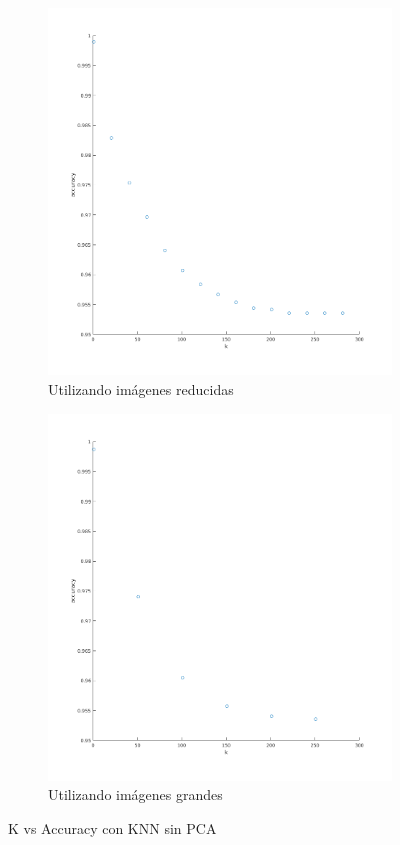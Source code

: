\begin{figure}[H]
\begin{subfigure}[h]{0.62\linewidth}
\includegraphics[width=\linewidth]{img/k_knn_accu.png}
\caption{Utilizando imágenes reducidas}
\end{subfigure}
\hfill
\begin{subfigure}[h]{0.62\linewidth}
\includegraphics[width=\linewidth]{img/big_k_knn_accu.png}
\caption{Utilizando imágenes grandes}
\end{subfigure}%
\caption{K vs Accuracy con KNN sin PCA}
\end{figure}

